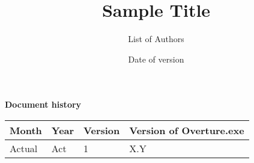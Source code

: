 \documentclass{overturerepchap}
\begin{document}
\title{Sample Title}
\author{List of Authors
}
\date{Date of version}


\maketitle


{\textbf{Document history}}

\begin{tabular}{|l|l|l|l|}\hline
Month   & Year & Version & Version of Overture.exe \\ \hline
Actual     & Act & 1 & X.Y \\ \hline
\end{tabular}
\end{document}
